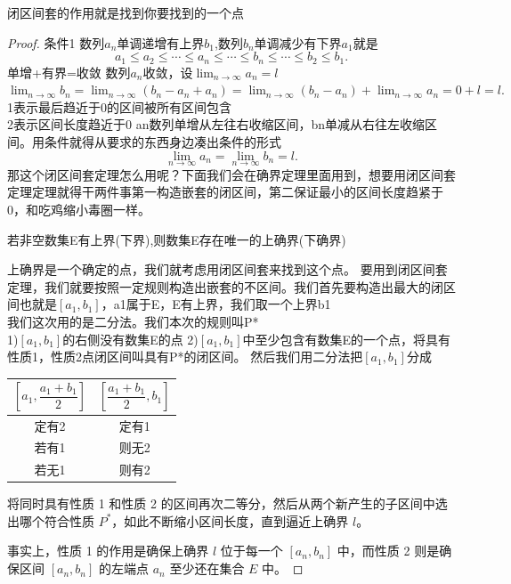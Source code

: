 \documentclass[lang=cn,10pt]{elegantbook}
\begin{document}
闭区间套的作用就是找到你要找到的一个点
\begin{proof}
    条件1 数列${a_n}$单调递增有上界$b_1$,数列${b_n}$单调减少有下界$a_1$就是
    \[
a_1 \leqslant a_2 \leqslant \cdots \leqslant a_n
\leqslant \cdots \leqslant b_n \leqslant \cdots
\leqslant b_2 \leqslant b_1.
\]
单增+有界=收敛 数列{$a_n$}收敛，设$\lim_{n \to \infty} a_n = l$\\
$\lim_{n \to \infty} b_n = \lim_{n \to \infty} (b_n - a_n + a_n) = \lim_{n \to \infty} (b_n - a_n) + \lim_{n \to \infty} a_n = 0 + l = l.$
   \\1表示最后趋近于0的区间被所有区间包含 \\   
 2表示区间长度趋近于0  an数列单增从左往右收缩区间，bn单减从右往左收缩区间。用条件就得从要求的东西身边凑出条件的形式 
 \[
\lim_{n \to \infty} a_n = \lim_{n \to \infty} b_n = l.
\]
那这个闭区间套定理怎么用呢？下面我们会在确界定理里面用到，想要用闭区间套定理定理就得干两件事第一构造嵌套的闭区间，第二保证最小的区间长度趋紧于0，和吃鸡缩小毒圈一样。
\begin{theorem}[确界定理]{}
若非空数集E有上界(下界),则数集E存在唯一的上确界(下确界)
    
\end{theorem}
上确界是一个确定的点，我们就考虑用闭区间套来找到这个点。
要用到闭区间套定理，我们就要按照一定规则构造出嵌套的不区间。我们首先要构造出最大的闭区间也就是$[a_1,b_1]$，a1属于E，E有上界，我们取一个上界b1\\我们这次用的是二分法。我们本次的规则叫P*\\
1)$[a_1,b_1]$的右侧没有数集E的点
2)$[a_1,b_1]$中至少包含有数集E的一个点，将具有性质1，性质2点闭区间叫具有P*的闭区间。
然后我们用二分法把$[a_1,b_1]$分成\\
\begin{tabular}{|c|c|}
  \hline
  $\left[a_1,\dfrac{a_1 + b_1}{2}\right]$ & $\left[\dfrac{a_1 + b_1}{2}, b_1\right]$ \\
  \hline
  定有2 & 定有1 \\
  \hline
  若有1 & 则无2 \\
  \hline
  若无1 & 则有2 \\
  \hline
\end{tabular}
将同时具有性质 1 和性质 2 的区间再次二等分，然后从两个新产生的子区间中选出哪个符合性质 $P^*$，如此不断缩小区间长度，直到逼近上确界 $l$。

事实上，性质 1 的作用是确保上确界 $l$ 位于每一个 $[a_n, b_n]$ 中，而性质 2 则是确保区间 $[a_n, b_n]$ 的左端点 $a_n$ 至少还在集合 $E$ 中。


\end{proof}
\end{document}
